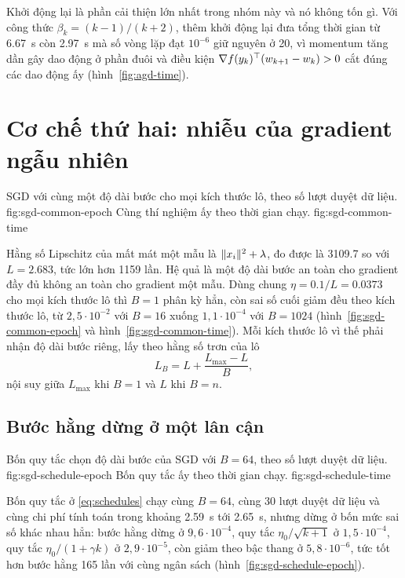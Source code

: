 Khởi động lại là phần cải thiện lớn nhất trong nhóm này và nó không tốn gì. Với
công thức $\beta_k = (k-1)/(k+2)$, thêm khởi động lại đưa tổng thời gian từ
\SI{6.67}{\second} còn \SI{2.97}{\second} mà số vòng lặp đạt $10^{-6}$ giữ nguyên
ở 20, vì momentum tăng dần gây dao động ở phần đuôi và điều kiện
$\nabla f(y_k)^{\top} (w_{k+1} - w_k) > 0$ cắt đúng các dao động ấy
(hình~\ref{fig:agd-time}).

\section{Cơ chế thứ hai: nhiễu của gradient ngẫu nhiên}
\label{sec:mech-noise}

  {SGD với cùng một độ dài bước cho mọi kích thước lô, theo số lượt duyệt dữ
   liệu.}
  {fig:sgd-common-epoch}
  {Cùng thí nghiệm ấy theo thời gian chạy.}
  {fig:sgd-common-time}

Hằng số Lipschitz của mất mát một mẫu là $\lVert x_i\rVert^{2} + \lambda$, đo được là
\num{3109.7} so với $L = \num{2.683}$, tức lớn hơn 1159 lần. Hệ quả là một độ dài
bước an toàn cho gradient đầy đủ không an toàn cho gradient một mẫu. Dùng chung
$\eta = 0.1/L = \num{0.0373}$ cho mọi kích thước lô thì $B = 1$ phân kỳ hẳn, còn
sai số cuối giảm đều theo kích thước lô, từ $2{,}5 \cdot 10^{-2}$ với $B = 16$
xuống $1{,}1 \cdot 10^{-4}$ với $B = 1024$ (hình~\ref{fig:sgd-common-epoch} và
hình~\ref{fig:sgd-common-time}). Mỗi kích thước lô vì thế phải nhận độ dài bước
riêng, lấy theo hằng số trơn của lô
%
\begin{equation}
  \label{eq:minibatch-smoothness}
  L_B = L + \frac{L_{\max} - L}{B} ,
\end{equation}
%
nội suy giữa $L_{\max}$ khi $B = 1$ và $L$ khi $B = n$.

\subsection{Bước hằng dừng ở một lân cận}
\label{sec:mech-schedule}

  {Bốn quy tắc chọn độ dài bước của SGD với $B = 64$, theo số lượt duyệt dữ liệu.}
  {fig:sgd-schedule-epoch}
  {Bốn quy tắc ấy theo thời gian chạy.}
  {fig:sgd-schedule-time}

Bốn quy tắc ở \eqref{eq:schedules} chạy cùng $B = 64$, cùng 30 lượt duyệt dữ liệu
và cùng chi phí tính toán trong khoảng \SI{2.59}{\second} tới
\SI{2.65}{\second}, nhưng dừng ở bốn mức sai số khác nhau hẳn: bước hằng dừng ở
$9{,}6 \cdot 10^{-4}$, quy tắc $\eta_0/\sqrt{k+1}$ ở $1{,}5 \cdot 10^{-4}$, quy
tắc $\eta_0/(1+\gamma k)$ ở $2{,}9 \cdot 10^{-5}$, còn giảm theo bậc thang ở
$5{,}8 \cdot 10^{-6}$, tức tốt hơn bước hằng 165 lần với cùng ngân sách
(hình~\ref{fig:sgd-schedule-epoch}).

